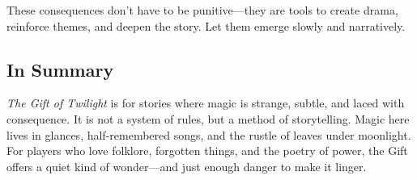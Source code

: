 These consequences don’t have to be punitive—they are tools to create drama, reinforce themes, and deepen the story. Let them emerge slowly and narratively.

\subsection{In Summary}

\textit{The Gift of Twilight} is for stories where magic is strange, subtle, and laced with consequence. It is not a system of rules, but a method of storytelling. Magic here lives in glances, half-remembered songs, and the rustle of leaves under moonlight. For players who love folklore, forgotten things, and the poetry of power, the Gift offers a quiet kind of wonder—and just enough danger to make it linger.